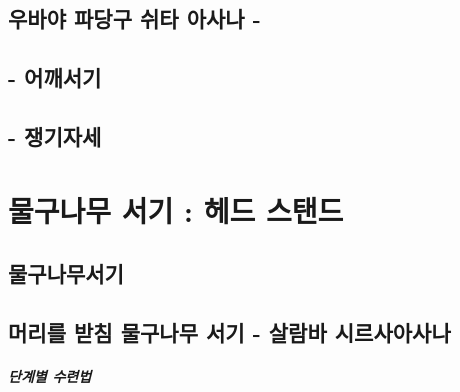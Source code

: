 \documentclass[12pt, a4paper, oneside]{book}
\let\stdsection\section
\renewcommand\section{\newpage\stdsection}
\begin{document}
%
%
%
	\section{우바야 파당구 쉬타 아사나 - }

%
%
%
	\section{ - 어깨서기}


%
%
%
	\section{ - 쟁기자세}


	\chapter{물구나무 서기 : 헤드 스탠드 }
	\newpage
	\minitoc


%
	\section{ 물구나무서기 }


%
	\section{ 머리를 받침 물구나무 서기 - 살람바 시르사아사나}


\paragraph{단계별 수련법}
\end{document}
